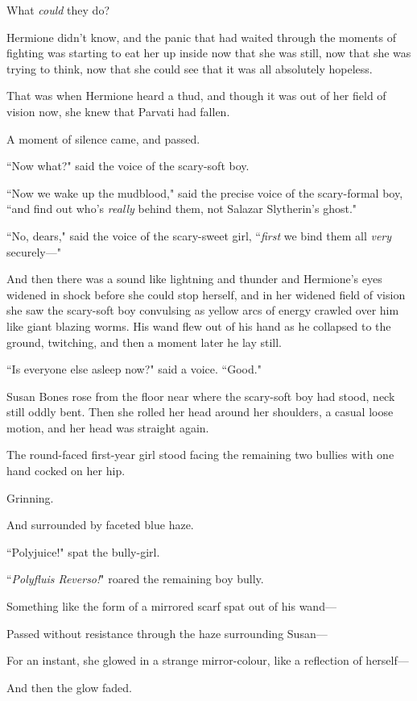 What \emph{could} they do?

Hermione didn't know, and the panic that had waited through the moments of fighting was starting to eat her up inside now that she was still, now that she was trying to think, now that she could see that it was all absolutely hopeless.

That was when Hermione heard a thud, and though it was out of her field of vision now, she knew that Parvati had fallen.

A moment of silence came, and passed.

``Now what?" said the voice of the scary-soft boy.

``Now we wake up the mudblood," said the precise voice of the scary-formal boy, ``and find out who's \emph{really} behind them, not Salazar Slytherin's ghost."

``No, dears," said the voice of the scary-sweet girl, ``\emph{first} we bind them all \emph{very} securely—"

And then there was a sound like lightning and thunder and Hermione's eyes widened in shock before she could stop herself, and in her widened field of vision she saw the scary-soft boy convulsing as yellow arcs of energy crawled over him like giant blazing worms. His wand flew out of his hand as he collapsed to the ground, twitching, and then a moment later he lay still.

``Is everyone else asleep now?" said a voice. ``Good."

Susan Bones rose from the floor near where the scary-soft boy had stood, neck still oddly bent. Then she rolled her head around her shoulders, a casual loose motion, and her head was straight again.

The round-faced first-year girl stood facing the remaining two bullies with one hand cocked on her hip.

Grinning.

And surrounded by faceted blue haze.

``Polyjuice!" spat the bully-girl.

``\emph{Polyfluis Reverso!}" roared the remaining boy bully.

Something like the form of a mirrored scarf spat out of his wand—

Passed without resistance through the haze surrounding Susan—

For an instant, she glowed in a strange mirror-colour, like a reflection of herself—

And then the glow faded.

